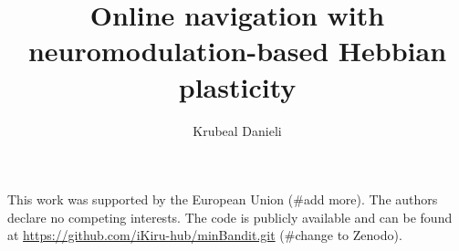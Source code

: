 \documentclass{article}
\begin{document}
\title{Online navigation with neuromodulation-based Hebbian plasticity}
\author{Krubeal Danieli}

\maketitle

\newpage

\tableofcontents

\newpage










\newpage



\newpage

This work was supported by the European Union (\#add more).
\hfill \break
The authors declare no competing interests.
\hfill \break
The code is publicly available and can be found at
\url{https://github.com/iKiru-hub/minBandit.git} (\#change to Zenodo).



\newpage


\end{document}
